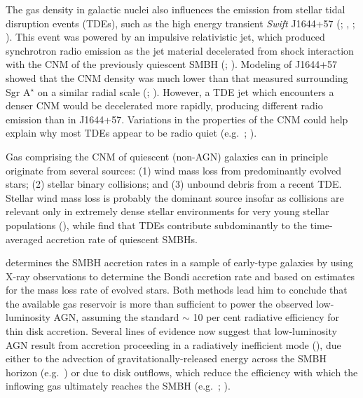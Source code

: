 \documentclass[usenatbib,fleqn]{mn2e}
\newcommand{\Mbh}[1][]{M_{\bullet#1}}
\begin{document}

The gas density in galactic nuclei also influences the emission from
stellar tidal disruption events (TDEs), such as the high energy
transient {\it Swift} J1644+57 (\citealt{Levan+11};
\citealt{Bloom+11}, \citealt{Burrows+11}; \citealt{Zauderer+11}).
This event was powered by an impulsive relativistic jet, which
produced synchrotron radio emission as the jet material decelerated
from shock interaction with the CNM of the previously quiescent SMBH
(\citealt{Giannios&Metzger11}; \citealt{Zauderer+11}).  Modeling of J1644+57 showed that the CNM density was much lower than
that measured surrounding Sgr A$^{\star}$ on a similar radial scale
(\citealt{Metzger+12}; \citealt{BergerZauderer+:2012a}).  However, a
TDE jet which encounters a denser CNM would be decelerated more rapidly,
producing different radio emission than in J1644+57.
Variations in the properties of the CNM could help explain why most
TDEs appear to be radio quiet (e.g.~\citealt{Bower+13};
\citealt{VanVelzen+13}).

Gas comprising the CNM of quiescent (non-AGN) galaxies can in principle originate from several
sources: (1) wind mass loss from predominantly evolved stars; (2)
stellar binary collisions; and (3) unbound debris from a recent TDE.
Stellar wind mass loss is probably the dominant source insofar as
collisions are relevant only in extremely dense stellar environments
for very young stellar populations (\citealt{Rubin&Loeb11}), while
\citet{MacLeod+13} find that TDEs contribute subdominantly to the
time-averaged accretion rate of quiescent SMBHs.

\citet{Ho:2009a} determines the SMBH accretion rates in a sample of
early-type galaxies by using X-ray observations to determine the Bondi
accretion rate and based on estimates for the mass loss rate of
evolved stars.  Both methods lead him to conclude that the available
gas reservoir is more than sufficient to power the observed
low-luminosity AGN, assuming the standard $\sim$ 10 per cent radiative
efficiency for thin disk accretion.  Several lines of evidence now
suggest that low-luminosity AGN result from accretion proceeding in a
radiatively inefficient mode (\citealt{Yuan&Narayan14}), due either to
the advection of gravitationally-released energy across the SMBH
horizon (e.g.~\citealt{Narayan&Yi95}) or due to disk outflows, which
reduce the efficiency with which the inflowing gas ultimately reaches
the SMBH (e.g.~\citealt{Blandford&Begelman99}; \citealt{Li+13}).
\end{document}
